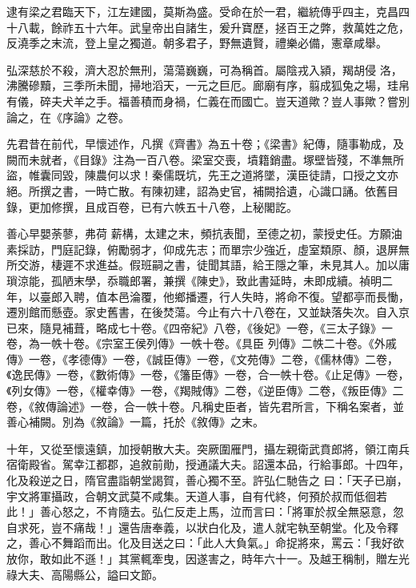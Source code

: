\begin{pinyinscope}
 逮有梁之君臨天下，江左建國，莫斯為盛。受命在於一君，繼統傳乎四主，克昌四十八載，餘祚五十六年。武皇帝出自諸生，爰升寶歷，拯百王之弊，救萬姓之危，反澆季之末流，登上皇之獨道。朝多君子，野無遺賢，禮樂必備，憲章咸舉。



 弘深慈於不殺，濟大忍於無刑，蕩蕩巍巍，可為稱首。屬陰戎入潁，羯胡侵
 洛，沸騰磣黷，三季所未聞，掃地滔天，一元之巨厄。廊廟有序，翦成狐兔之場，珪帛有儀，碎夫犬羊之手。福善積而身禍，仁義在而國亡。豈天道歟？豈人事歟？嘗別論之，在《序論》之卷。



 先君昔在前代，早懷述作，凡撰《齊書》為五十卷；《梁書》紀傳，隨事勒成，及闕而未就者，《目錄》注為一百八卷。梁室交喪，墳籍銷盡。塚壁皆殘，不準無所盜，帷囊同毀，陳農何以求！秦儒既坑，先王之道將墜，漢臣徒請，口授之文亦絕。所撰之書，一時亡散。有陳初建，詔為史官，補闕拾遺，心識口誦。依舊目錄，更加修撰，且成百卷，已有六帙五十八卷，上秘閣訖。



 善心早嬰荼蓼，弗荷
 薪構，太建之末，頻抗表聞，至德之初，蒙授史任。方願油素採訪，門庭記錄，俯勵弱才，仰成先志；而單宗少強近，虛室類原、顏，退屏無所交游，棲遲不求進益。假班嗣之書，徒聞其語，給王隱之筆，未見其人。加以庸瑣涼能，孤陋末學，忝職郎署，兼撰《陳史》，致此書延時，未即成續。禎明二年，以臺郎入聘，值本邑淪覆，他鄉播遷，行人失時，將命不復。望都亭而長慟，遷別館而懸壺。家史舊書，在後焚蕩。今止有六十八卷在，又並缺落失次。自入京已來，隨見補葺，略成七十卷。《四帝紀》八卷，《後妃》一卷，《三太子錄》一卷，為一帙十卷。《宗室王侯列傳》一帙十卷。《具臣
 列傳》二帙二十卷。《外戚傳》一卷，《孝德傳》一卷，《誠臣傳》一卷，《文苑傳》二卷，《儒林傳》二卷，《逸民傳》一卷，《數術傳》一卷，《籓臣傳》一卷，合一帙十卷。《止足傳》一卷，《列女傳》一卷，《權幸傳》一卷，《羯賊傳》二卷，《逆臣傳》二卷，《叛臣傳》二卷，《敘傳論述》一卷，合一帙十卷。凡稱史臣者，皆先君所言，下稱名案者，並善心補闕。別為《敘論》一篇，托於《敘傳》之末。



 十年，又從至懷遠鎮，加授朝散大夫。突厥圍雁門，攝左親衛武賁郎將，領江南兵宿衛殿省。駕幸江都郡，追敘前勛，授通議大夫。詔還本品，行給事郎。十四年，化及殺逆之日，隋官盡詣朝堂謁賀，善心獨不至。許弘仁馳告之
 曰：「天子已崩，宇文將軍攝政，合朝文武莫不咸集。天道人事，自有代終，何預於叔而低徊若此！」善心怒之，不肯隨去。弘仁反走上馬，泣而言曰：「將軍於叔全無惡意，忽自求死，豈不痛哉！」還告唐奉義，以狀白化及，遣人就宅執至朝堂。化及令釋之，善心不舞蹈而出。化及目送之曰：「此人大負氣。」命捉將來，罵云：「我好欲放你，敢如此不遜！」其黨輒牽曳，因遂害之，時年六十一。及越王稱制，贈左光祿大夫、高陽縣公，謚曰文節。




\end{pinyinscope}
